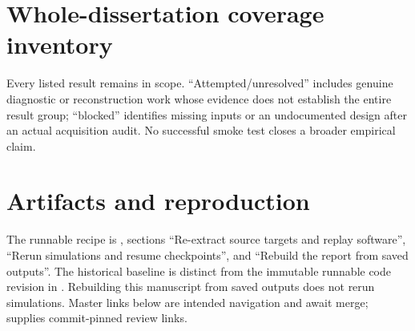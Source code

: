 \appendix
\section{Whole-dissertation coverage inventory}\label{sec:coverage}
Every listed result remains in scope. ``Attempted/unresolved'' includes genuine diagnostic or reconstruction work whose evidence does not establish the entire result group; ``blocked'' identifies missing inputs or an undocumented design after an actual acquisition audit. No successful smoke test closes a broader empirical claim.
{\footnotesize}

\section{Artifacts and reproduction}
The runnable recipe is , sections ``Re-extract source targets and replay software'', ``Rerun simulations and resume checkpoints'', and ``Rebuild the report from saved outputs''. The historical baseline is distinct from the immutable runnable code revision in . Rebuilding this manuscript from saved outputs does not rerun simulations. Master links below are intended navigation and await merge;  supplies commit-pinned review links.
